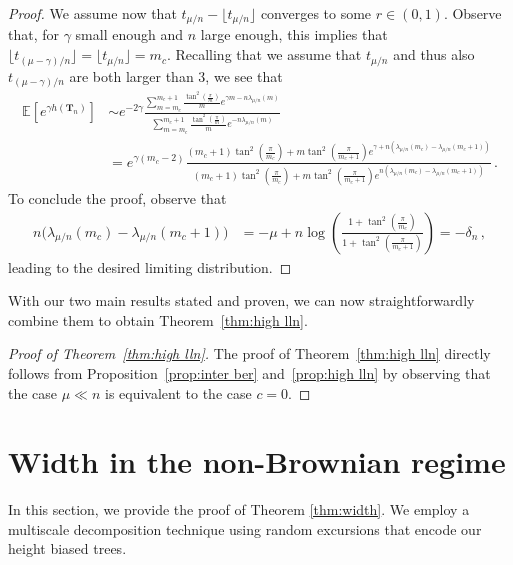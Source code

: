 \documentclass{article}
\newcommand{\E}{\mathbb{E}}								%
\newcommand{\1}{\mathbbm{1}}								%
\theoremstyle{definition}
\numberwithin{equation}{section}
\newcommand{\bT}{\mathbf T}
\begin{document}
\begin{proof}
    We assume now that $t_{\mu/n}-\lfloor t_{\mu/n}\rfloor$ converges to some $r\in(0,1)$.
    Observe that, for $\gamma$ small enough and $n$ large enough, this implies that $\lfloor t_{(\mu-\gamma)/n}\rfloor=\lfloor t_{\mu/n}\rfloor=m_c$.
    Recalling that we assume that $t_{\mu/n}$ and thus also $t_{(\mu-\gamma)/n}$ are both larger than $3$, we see that
    \begin{align*}
        \E\left[e^{\gamma h(\bT_n)}\right]&\sim e^{-2\gamma}\frac{\sum_{m=m_c}^{m_c+1}\frac{\tan^2\left(\frac{\pi}{m}\right)}{m}e^{\gamma m-n\lambda_{\mu/n}(m)}}{\sum_{m=m_c}^{m_c+1}\frac{\tan^2\left(\frac{\pi}{m}\right)}{m}e^{-n\lambda_{\mu/n}(m)}}\\
        &=e^{\gamma(m_c-2)}\frac{(m_c+1)\tan^2\left(\frac{\pi}{m_c}\right)+m\tan^2\left(\frac{\pi}{m_c+1}\right)e^{\gamma+n(\lambda_{\mu/n}(m_c)-\lambda_{\mu/n}(m_c+1))}}{(m_c+1)\tan^2\left(\frac{\pi}{m_c}\right)+m\tan^2\left(\frac{\pi}{m_c+1}\right)e^{n(\lambda_{\mu/n}(m_c)-\lambda_{\mu/n}(m_c+1))}}\,.
    \end{align*}
    To conclude the proof, observe that
    \begin{align*}
        n\big(\lambda_{\mu/n}(m_c)-\lambda_{\mu/n}(m_c+1)\big)&=-\mu+n\log\left(\frac{1+\tan^2\left(\frac{\pi}{m_c}\right)}{1+\tan^2\left(\frac{\pi}{m_c+1}\right)}\right)=-\delta_n\,,
    \end{align*}
    leading to the desired limiting distribution.
\end{proof}

With our two main results stated and proven, we can now straightforwardly combine them to obtain Theorem~\ref{thm:high lln}.

\begin{proof}[Proof of Theorem~\ref{thm:high lln}]
    The proof of Theorem~\ref{thm:high lln} directly follows from Proposition~\ref{prop:inter ber} and~\ref{prop:high lln} by observing that the case $\mu\ll n$ is equivalent to the case $c=0$.
\end{proof}

\section{Width in the non-Brownian regime}\label{sec:inter_width_proof}

In this section, we provide the proof of Theorem \ref{thm:width}. We employ a multiscale decomposition technique using random excursions that encode our height biased trees. 
\end{document}

